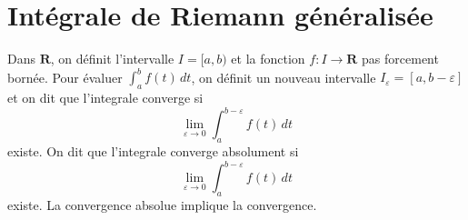 \section{Intégrale de Riemann généralisée}
\begin{reminder}
Dans $\mathbf{R}$, on définit l'intervalle $I=[a,b)$ et la fonction $f:I\to \mathbf{R}$ pas forcement bornée. Pour évaluer $\int_{a}^{b} f(t) \, dt$, on définit un nouveau intervalle $I_{\varepsilon}=[a,b-\varepsilon]$ et on dit que l'integrale converge si 
$$
	\lim_{ \varepsilon \to 0 } \int_{a}^{b-\varepsilon}f(t)  \, dt 
$$
existe. On dit que l'integrale converge absolument si
$$
	\lim_{ \varepsilon \to 0 } \int_{a}^{b-\varepsilon}f(t)  \, dt 
$$
existe. La convergence absolue implique la convergence.
\end{reminder}

